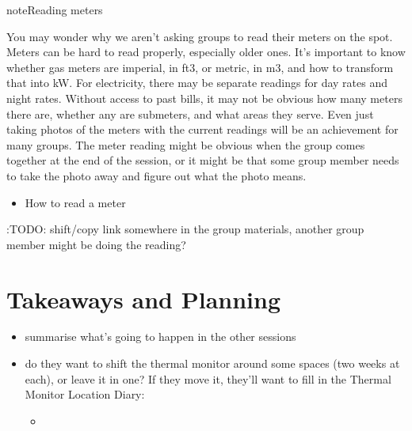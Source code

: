 \documentclass[letterpaper,10pt,english]{jupyterBook}
\begin{document}
\begin{sphinxadmonition}{note}{Reading meters}

\sphinxAtStartPar
You may wonder why we aren’t asking groups to read their meters on the spot.  Meters can be hard to read properly, especially older ones.  It’s important to know whether gas meters are imperial, in ft3, or metric, in m3, and how to transform that into kW.  For electricity, there may be separate readings for day rates and night rates.  Without access to past bills, it may not be obvious how many meters there are, whether any are submeters, and what areas they serve.  Even just taking photos of the meters with the current readings will be an achievement for many groups.  The meter reading might be obvious when the group comes together at the end of the session, or it might be that some group member needs to take the photo away and figure out what the photo means.
\begin{itemize}
\item {} 
\sphinxAtStartPar
How to read a meter 

\end{itemize}

\sphinxAtStartPar
:TODO: shift/copy link somewhere in the group materials, another group member might
be doing the reading?
\end{sphinxadmonition}

\sphinxstepscope


\section{Takeaways and Planning}
\label{\detokenize{session1/details/takeaways-and-planning:takeaways-and-planning}}\label{\detokenize{session1/details/takeaways-and-planning::doc}}\begin{itemize}
\item {} 
\sphinxAtStartPar
summarise what’s going to happen in the other sessions

\item {} 
\sphinxAtStartPar
do they want to shift the thermal monitor around some spaces (two weeks at each), or leave it in one?  If they move it, they’ll want to fill in the Thermal Monitor Location Diary:
\begin{itemize}
\item {} 
\sphinxAtStartPar
{}

\end{itemize}

\end{itemize}
\end{document}
